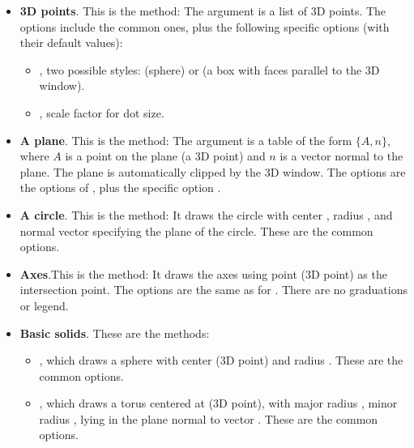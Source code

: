 \begin{itemize}
    \item \textbf{3D points}. This is the method: 
    The argument  is a list of 3D points. The options include the common ones, plus the following specific options (with their default values): 
        \begin{itemize}
            \item {}, two possible styles:  (sphere) or  (a box with faces parallel to the 3D window).
            \item {}, scale factor for dot size.
        \end{itemize}
       
    \item \textbf{A plane}. This is the method: 
    The argument  is a table of the form $\{A, n\}$, where $A$ is a point on the plane  (a 3D point) and $n$ is a vector normal to the plane. The plane is automatically clipped by the 3D window. The options are the options of , plus the specific option .
    
    \item \textbf{A circle}. This is the method: 
    It draws the circle with center , radius , and normal vector  specifying the plane of the circle. These are the common options.
    
     \item \textbf{Axes}.This is the method: 
    It draws the axes using point  (3D point) as the intersection point. The options are the same as for . There are no graduations or legend.   
    
    \item \textbf{Basic solids}. These are the methods:
        \begin{itemize}
            \item {}, which draws a sphere with center  (3D point) and radius . These are the common options.
    
            \item {}, which draws a torus centered at  (3D point), with major radius , minor radius , lying in the plane normal to vector . These are the common options.
    

\end{itemize}
\end{itemize}

